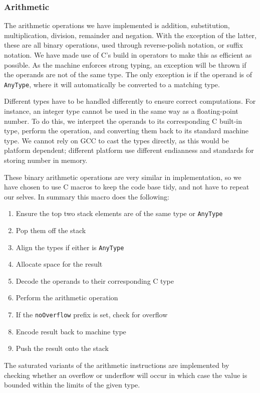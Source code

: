 \subsubsection{Arithmetic}

The arithmetic operations we have implemented is addition, substitution,
multiplication, division, remainder and negation. With the exception of the
latter, these are all binary operations, used through reverse-polish notation,
or suffix notation. We have made use of C's build in operators to make this as
efficient as possible. As the machine enforces strong typing, an exception will
be thrown if the operands are not of the same type. The only exception is if the
operand is of {\tt AnyType}, where it will automatically be converted to a
matching type.

Different types have to be handled differently to ensure correct
computations. For instance, an integer type cannot be used in the same way as a
floating-point number. To do this, we interpret the operands to its
corresponding C built-in type, perform the operation, and converting them back
to its standard machine type. We cannot rely on GCC to cast the types directly,
as this would be platform dependent; different platform use different endianness
and standards for storing number in memory.

These binary arithmetic operations are very similar in implementation, so we
have chosen to use C macros to keep the code base tidy, and not have to repeat
our selves. In summary this macro does the following:

\begin{enumerate}
  \item Ensure the top two stack elements are of the same type or {\tt AnyType}
  \item Pop them off the stack
  \item Align the types if either is {\tt AnyType}
  \item Allocate space for the result
  \item Decode the operands to their corresponding C type
  \item Perform the arithmetic operation
  \item If the {\tt noOverflow} prefix is set, check for overflow
  \item Encode result back to machine type
  \item Push the result onto the stack
\end{enumerate}

The saturated variants of the arithmetic instructions are implemented by
checking whether an overflow or underflow will occur in which case the value is
bounded within the limits of the given type.

